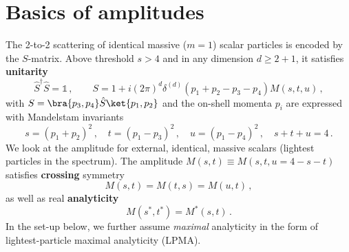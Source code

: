 

\section*{Basics of amplitudes}

The 2-to-2 scattering of identical massive ($m=1$) scalar particles is encoded by the $S$-matrix. Above threshold $s > 4$ and in any dimension $d\geq2+1$, it satisfies \textbf{unitarity}
\begin{equation}
\hat S^\dagger \hat  S=\mathbb{1}\,, \qquad
S=1+i (2\pi)^d \delta^{(d)}(p_1+p_2-p_3-p_4) M(s,t,u)\,,
\label{eq:unitarity} 
\end{equation}
with $S=\bra{p_3,p_4} \hat{S} \ket{p_1, p_2}$ and the on-shell momenta $p_i$ are expressed with Mandelstam invariants
\begin{equation}
s=(p_1+p_2)^2\,,\quad
t=(p_1-p_3)^2\,,\quad
u=(p_1-p_4)^2\,,\quad
s+t+u=4\,.
\end{equation}
We look at the amplitude for external, identical, massive scalars (lightest particles in the spectrum). The amplitude $M(s,t)\equiv M(s,t,u=4-s-t)$ satisfies \textbf{crossing} symmetry
\begin{equation}
M(s,t)=M(t,s)=M(u,t)\,,
\end{equation}
as well as real \textbf{analyticity} 
\begin{equation}
M(s^*,t^*)=M^*(s,t)\,.
\end{equation}
In the set-up below, we further assume {\it maximal} analyticity in the form of lightest-particle maximal analyticity (LPMA).




